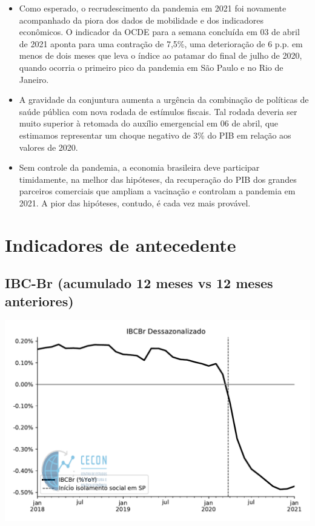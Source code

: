 \documentclass{SelfArx}
\begin{document}
{\begin{itemize}
\item Como esperado, o recrudescimento da pandemia em 2021 foi novamente acompanhado da piora dos dados de mobilidade e dos indicadores econômicos. O indicador da OCDE para a semana concluída em 03 de abril de 2021 aponta para uma contração de 7,5\%, uma deterioração de 6 p.p. em menos de dois meses que leva o índice ao patamar do final de julho de 2020, quando ocorria o primeiro pico da pandemia em São Paulo e no Rio de Janeiro.
\item A gravidade da conjuntura aumenta a urgência da combinação de políticas de saúde pública com nova rodada de estímulos fiscais. Tal rodada deveria ser muito superior à retomada do auxílio emergencial em 06 de abril, que estimamos representar um choque negativo de 3\% do PIB em relação aos valores de 2020.
\item Sem controle da pandemia, a economia brasileira deve participar timidamente, na melhor das hipóteses, da recuperação do PIB dos grandes parceiros comerciais que ampliam a vacinação e controlam a pandemia em 2021. A pior das hipóteses, contudo, é cada vez mais provável.
\end{itemize}
}
\renewcommand{\abstractname}{Sumário Executivo} %
\flushbottom %
\maketitle %
\thispagestyle{empty} %
\onecolumn


\section*{Indicadores de antecedente}
\label{sec:org4e39b7b}
\subsection*{IBC-Br (acumulado 12 meses vs 12 meses anteriores)}
\label{sec:org28f78fb}

\begin{center}
\includegraphics[width=.9\linewidth]{./figs/Antecedente/IBCBr.pdf}
\end{center}
\end{document}
